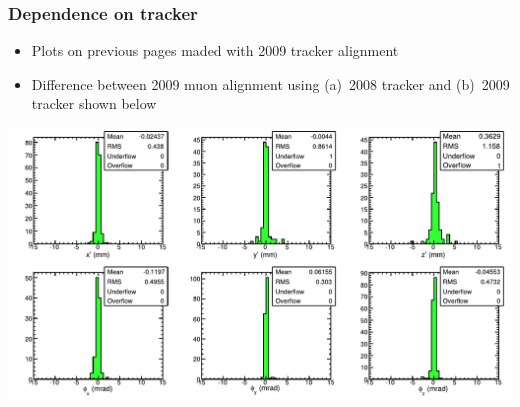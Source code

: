 \documentclass[compress]{beamer}
\begin{document}
\begin{frame}
\frametitle{Dependence on tracker}
\begin{itemize}
\item Plots on previous pages maded with 2009 tracker alignment
\item Difference between 2009 muon alignment using (a)~2008 tracker
  and (b)~2009 tracker shown below
\end{itemize}

\includegraphics[width=\linewidth]{effect_of_trackeralignment.pdf}
\end{frame}
\end{document}
